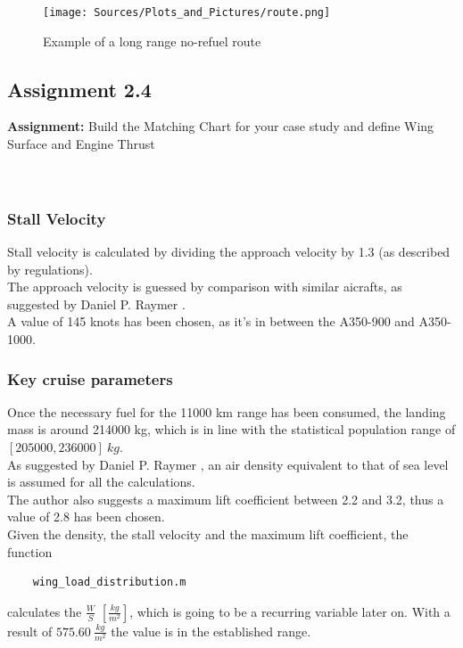 \documentclass{article}
\begin{document}
\begin{figure}[h!]
    \centering
    \texttt{[image: Sources/Plots\_and\_Pictures/route.png]}
    \caption{Example of a long range no-refuel route}
    \label{Global_Coverage}
\end{figure}
\clearpage


\pagebreak 

\subsection{Assignment 2.4\label{Assignment_2.4}}
\textbf{Assignment:} Build the Matching Chart for your case study and define
 Wing Surface and Engine Thrust \\ \\ \\ 

 \subsubsection{Stall Velocity\label{stall_velocity}}

 Stall velocity is calculated by dividing
 the approach velocity by 1.3 (as described by regulations). \\ 
 The approach velocity is guessed by comparison with similar aicrafts, as suggested by Daniel P. Raymer \autocite{Raymer_Daniel}.\\ 
 A value of 145 knots has been chosen, as it's in between the A350-900 and A350-1000.\\ 

 \subsubsection{Key cruise parameters\label{cruise_parameters}}

 Once the necessary fuel for the 11000 km range has been consumed, the landing mass is around 214000 kg,
 which is in line with the statistical population range of $[205000, 236000] \ kg$.\\ 
 As suggested by Daniel P. Raymer \autocite{Raymer_Daniel}, an air density equivalent
 to that of sea level is assumed for all the calculations. \\ 
 The author also suggests a maximum lift coefficient between 2.2 and 3.2, thus a value
 of 2.8 has been chosen.\\ 
 Given the density, the stall velocity and the maximum lift coefficient, the function \autocite{Airbus_replacement_repo}
 \begin{verbatim}
    wing_load_distribution.m
 \end{verbatim}
calculates the $\frac{W}{S}$  $[\frac{kg}{m^2}]$, which is going to be a recurring variable later on.
With a result of $575.60 \ \frac{kg}{m^2}$ the value is in the established range. 
\end{document}
